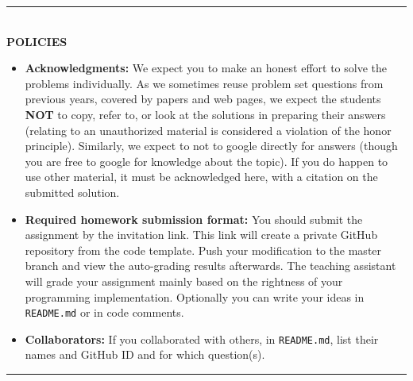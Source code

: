 \vspace{3em}

\rule{\textwidth}{1pt}
\\
\textbf{POLICIES}
\begin{itemize}
\item {\bf Acknowledgments: \/} 
  We expect you to make an honest effort to solve the problems individually.  As we sometimes reuse problem set questions from previous years, covered by papers and web pages, we expect the students \textbf{NOT} to copy, refer to, or look at the solutions in preparing their answers (relating to an unauthorized material is considered a violation of the honor principle). Similarly, we expect to not to google directly for answers (though you are free to google for knowledge about the topic). If you do happen to use other material, it must be acknowledged here, with a citation on the submitted solution.
  
\item {\bf Required homework submission format: \/} 
  You should submit the assignment by the invitation link. This link will create a private GitHub repository from the code template.
  Push your modification to the master branch and view the auto-grading results afterwards. The teaching assistant will grade your
  assignment mainly based on the rightness of your programming implementation.
  Optionally you can write your ideas in \texttt{README.md} or in code comments.
  

\item {\bf Collaborators: \/}
If you collaborated with others, in \texttt{README.md}, list their names and GitHub ID and for which question(s).
\end{itemize}
\rule{\textwidth}{1pt}
